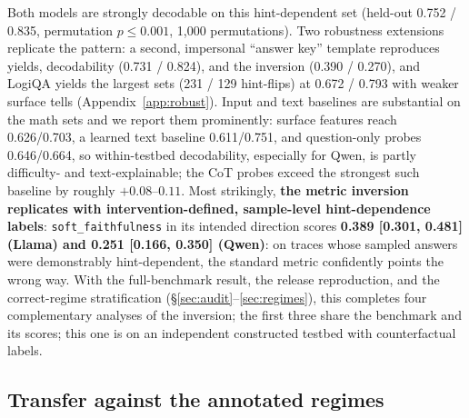 \documentclass[11pt]{article}
\begin{document}
Both models are strongly decodable on this hint-dependent set (held-out 0.752 / 0.835, permutation $p{\leq}0.001$, 1{,}000 permutations). Two robustness extensions replicate the pattern: a second, impersonal ``answer key'' template reproduces yields, decodability (0.731 / 0.824), and the inversion (0.390 / 0.270), and LogiQA yields the largest sets (231 / 129 hint-flips) at 0.672 / 0.793 with weaker surface tells (Appendix~\ref{app:robust}). Input and text baselines are substantial on the math sets and we report them prominently: surface features reach 0.626/0.703, a learned text baseline 0.611/0.751, and question-only probes 0.646/0.664, so within-testbed decodability, especially for Qwen, is partly difficulty- and text-explainable; the CoT probes exceed the strongest such baseline by roughly $+0.08$--$0.11$. Most strikingly, \textbf{the metric inversion replicates with intervention-defined, sample-level hint-dependence labels}: \texttt{soft\_faithfulness} in its intended direction scores \textbf{0.389 [0.301, 0.481] (Llama) and 0.251 [0.166, 0.350] (Qwen)}: on traces whose sampled answers were demonstrably hint-dependent, the standard metric confidently points the wrong way. With the full-benchmark result, the release reproduction, and the correct-regime stratification (\S\ref{sec:audit}--\ref{sec:regimes}), this completes four complementary analyses of the inversion; the first three share the benchmark and its scores; this one is on an independent constructed testbed with counterfactual labels.

\subsection{Transfer against the annotated regimes}
\label{sec:bridge}
\end{document}
